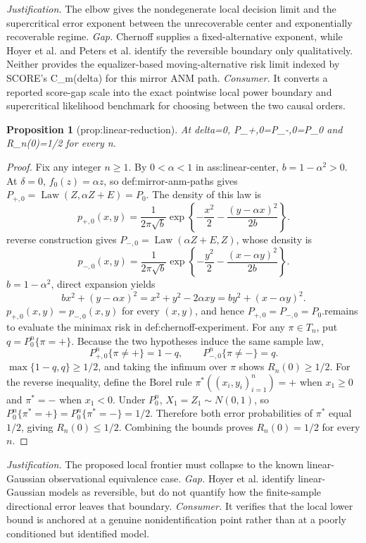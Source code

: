 \documentclass{article}
\newtheorem{proposition}{Proposition}
\begin{document}
\par\smallskip\noindent \textit{Justification.} The elbow gives the nondegenerate local decision limit and the supercritical error exponent between the unrecoverable center and exponentially recoverable regime. \textit{Gap.} Chernoff supplies a fixed-alternative exponent, while Hoyer et al. and Peters et al. identify the reversible boundary only qualitatively. Neither provides the equalizer-based moving-alternative risk limit indexed by SCORE's C_m(delta) for this mirror ANM path. \textit{Consumer.} It converts a reported score-gap scale into the exact pointwise local power boundary and supercritical likelihood benchmark for choosing between the two causal orders.

\begin{proposition}[prop:linear-reduction]\label{prop:linear-reduction}
At delta=0, P_{+,0}=P_{-,0}=P_0 and R_n(0)=1/2 for every n.
\end{proposition}
\begin{proof}
Fix any integer $n\ge 1$. By $0<\alpha<1$ in ass:linear-center, $b=1-\alpha^2>0$. At $\delta=0$, $f_0(z)=\alpha z$, so def:mirror-anm-paths gives $P_{+,0}=\operatorname{Law}(Z,\alpha Z+E)=P_0$. The density of this law is\n\[p_{+,0}(x,y)=\frac{1}{2\pi\sqrt b}\exp\left\{-\frac{x^2}{2}-\frac{(y-\alpha x)^2}{2b}\right\}.\]\nThe reverse construction gives $P_{-,0}=\operatorname{Law}(\alpha Z+E,Z)$, whose density is\n\[p_{-,0}(x,y)=\frac{1}{2\pi\sqrt b}\exp\left\{-\frac{y^2}{2}-\frac{(x-\alpha y)^2}{2b}\right\}.\]\nSince $b=1-\alpha^2$, direct expansion yields\n\[b x^2+(y-\alpha x)^2=x^2+y^2-2\alpha xy=b y^2+(x-\alpha y)^2.\]\nConsequently $p_{+,0}(x,y)=p_{-,0}(x,y)$ for every $(x,y)$, and hence $P_{+,0}=P_{-,0}=P_0$.\n\nIt remains to evaluate the minimax risk in def:chernoff-experiment. For any $\pi\in T_n$, put $q=P_0^n\{\pi=+\}$. Because the two hypotheses induce the same sample law,\n\[P_{+,0}^n\{\pi\ne +\}=1-q,\qquad P_{-,0}^n\{\pi\ne -\}=q.\]\nThus $\max\{1-q,q\}\ge 1/2$, and taking the infimum over $\pi$ shows $R_n(0)\ge 1/2$. For the reverse inequality, define the Borel rule $\pi^*((x_i,y_i)_{i=1}^n)=+$ when $x_1\ge0$ and $\pi^*=-$ when $x_1<0$. Under $P_0^n$, $X_1=Z_1\sim N(0,1)$, so $P_0^n\{\pi^*=+\}=P_0^n\{\pi^*=-\}=1/2$. Therefore both error probabilities of $\pi^*$ equal $1/2$, giving $R_n(0)\le1/2$. Combining the bounds proves $R_n(0)=1/2$ for every $n$.
\end{proof}
\par\smallskip\noindent \textit{Justification.} The proposed local frontier must collapse to the known linear-Gaussian observational equivalence case. \textit{Gap.} Hoyer et al. identify linear-Gaussian models as reversible, but do not quantify how the finite-sample directional error leaves that boundary. \textit{Consumer.} It verifies that the local lower bound is anchored at a genuine nonidentification point rather than at a poorly conditioned but identified model.
\end{document}
